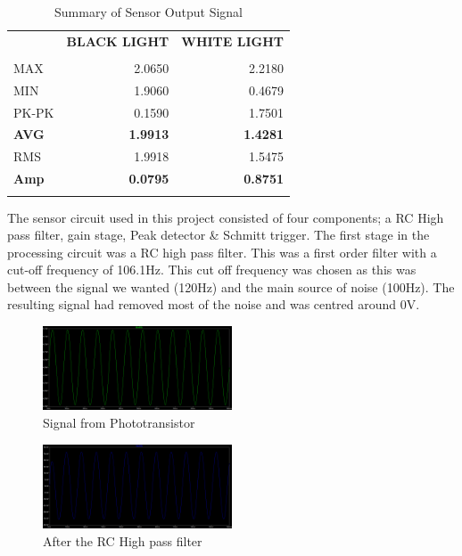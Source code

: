 \documentclass{article}
\begin{document}
\begin{table}[htbp]
  \centering
  \caption{Summary of Sensor Output Signal}
    \begin{tabular}{rrr}
          & \multicolumn{1}{l}{\textbf{BLACK LIGHT}} & \multicolumn{1}{l}{\textbf{WHITE LIGHT}} \\
          &       &  \\
    \multicolumn{1}{l}{MAX} & 2.0650 & 2.2180 \\
    \multicolumn{1}{l}{MIN} & 1.9060 & 0.4679 \\
    \multicolumn{1}{l}{PK-PK} & 0.1590 & 1.7501 \\
    \multicolumn{1}{l}{\textbf{AVG}} & \textbf{1.9913} & \textbf{1.4281} \\
    \multicolumn{1}{l}{RMS} & 1.9918 & 1.5475 \\
    \multicolumn{1}{l}{\textbf{Amp}} & \textbf{0.0795} & \textbf{0.8751} \\
          &       &  \\
    \end{tabular}%
  \label{tab:addlabel}%
\end{table}%

The sensor circuit used in this project consisted of four components; a RC High pass filter, gain stage, Peak detector \& Schmitt trigger. The first stage in the processing circuit was a RC high pass filter. This was a first order filter with a cut-off frequency of 106.1Hz. This cut off frequency was chosen as this was between the signal we wanted (120Hz) and the main source of noise (100Hz). The resulting signal had removed most of the noise and was centred around 0V.

\begin{figure}[!h]
\centerline{\includegraphics[width=0.5\textwidth]{stage_1}}
\caption{Signal from Phototransistor}
\label{fig:stage1}
\end{figure}

\begin{figure}[!h]
\centerline{\includegraphics[width=0.5\textwidth]{stage_2}}
\caption{After the RC High pass filter}
\label{fig:stage2}
\end{figure}
\end{document}
